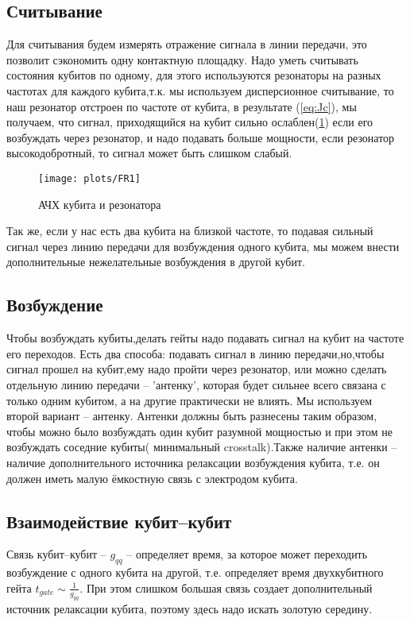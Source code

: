 \documentclass[12pt, a4paper, openany]{book}
\begin{document}
		\subsection{Считывание}
Для считывания будем измерять отражение сигнала в линии передачи, это позволит сэкономить одну контактную площадку.
Надо уметь считывать состояния кубитов по одному, для этого используются резонаторы на разных частотах для каждого кубита,т.к. мы используем дисперсионное считывание, то наш резонатор отстроен по частоте от кубита, в результате (\ref{eq:Jc}), мы получаем, что сигнал, приходящийся на кубит сильно ослаблен(\ref{fig:Res_filter}) если его возбуждать через резонатор, и надо подавать больше мощности, если резонатор высокодобротный, то сигнал может быть слишком слабый.
	\begin{figure}[h]
		\begin{center}
\texttt{[image: plots/FR1]}
\caption{АЧХ кубита и резонатора}
		\end{center}
		\label{fig:Res_filter}
	\end{figure}
Так же, если у нас есть два кубита на близкой частоте, то подавая сильный сигнал через линию передачи для возбуждения одного кубита, мы можем внести дополнительные нежелательные возбуждения в другой кубит.
		
		\subsection{Возбуждение}
Чтобы возбуждать кубиты,делать гейты надо подавать сигнал на кубит на частоте его переходов. Есть два способа: подавать сигнал в линию передачи,но,чтобы сигнал прошел на кубит,ему надо пройти через резонатор, или 
можно сделать отдельную линию передачи -- 'антенку', которая будет сильнее всего связана с только одним кубитом, а на другие практически не влиять. Мы используем второй вариант -- антенку. Антенки должны быть разнесены таким образом, чтобы можно было возбуждать один кубит разумной мощностью и при этом не возбуждать соседние кубиты( минимальный crosstalk).Также наличие антенки -- наличие дополнительного источника релаксации возбуждения кубита, т.е. он должен иметь малую ёмкостную связь с электродом кубита. 		
 		\subsection{Взаимодействие кубит--кубит}
Связь кубит--кубит -- $g_{qq}$ -- определяет время, за которое может переходить возбуждение с одного кубита на другой, т.е. определяет время двухкубитного гейта\cite{Rigetti2010} $t_{gate}\sim \frac{1}{g_{qq}}$. При этом слишком большая связь создает дополнительный источник релаксации кубита, поэтому здесь надо искать золотую середину.
\end{document}
